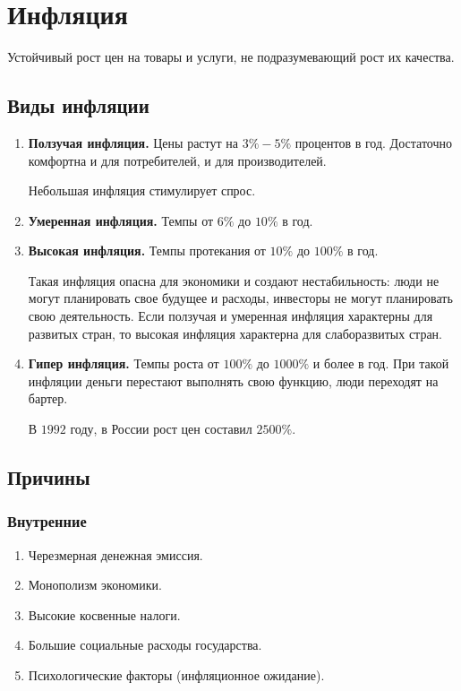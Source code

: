 \documentclass[12pt]{article}
\begin{document}
	\section{Инфляция}
	
	\begin{definition}[Инфляция]
		Устойчивый рост цен на товары и услуги, не подразумевающий рост их качества.
	\end{definition}
	
	\subsection{Виды инфляции}
	
	\begin{enumerate}
		\item \textbf{Ползучая инфляция.} Цены растут на $3\% - 5\%$ процентов в год. Достаточно комфортна и для потребителей, и для производителей.
		
		Небольшая инфляция стимулирует спрос.
		
		\item \textbf{Умеренная инфляция.} Темпы от $6\%$ до $10\%$ в год.
		
		\item \textbf{Высокая инфляция.} Темпы протекания от $10\%$ до $100\%$ в год.
		
		Такая инфляция опасна для экономики и создают нестабильность: люди не могут планировать свое будущее и расходы, инвесторы не могут планировать свою деятельность. Если ползучая и умеренная инфляция характерны для развитых стран, то высокая инфляция характерна для слаборазвитых стран.
		
		\item \textbf{Гипер инфляция.} Темпы роста от $100\%$ до $1000\%$ и более в год. При такой инфляции деньги перестают выполнять свою функцию, люди переходят на бартер.
		
		В $1992$ году, в России рост цен составил $2500\%$.
	\end{enumerate}
	
	\subsection{Причины}
	
	\subsubsection{Внутренние}
	
	\begin{enumerate}
		\item Черезмерная денежная эмиссия.
		\item Монополизм экономики.
		\item Высокие косвенные налоги.
		\item Большие социальные расходы государства.
		\item Психологические факторы (инфляционное ожидание).
	\end{enumerate}
\end{document}
